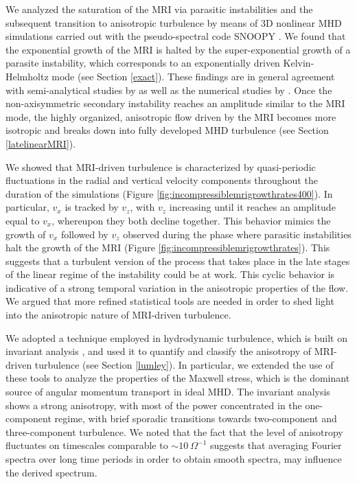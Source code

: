 \documentclass[]{emulateapj}
\begin{document}
We analyzed the saturation of the MRI via parasitic instabilities
and the subsequent transition to anisotropic turbulence by means of 3D
nonlinear MHD simulations carried out with the pseudo-spectral code
SNOOPY \citep{Lesur:2009ey}.  
We found that the exponential growth of the MRI is halted by the super-exponential
growth of a parasite instability, which corresponds to an
exponentially driven Kelvin-Helmholtz mode (see Section \ref{exact}).  
These findings are in general agreement with semi-analytical studies by
\citet{Goodman:1994dd, Pessah:2010ic} as well as the numerical studies by 
\citet{Latter:2009br,2010A&A...516A..51L,Obergaulinger:2009fv}.
Once the non-axisymmetric secondary instability reaches
an amplitude similar to the MRI mode, the highly organized,
anisotropic flow driven by the MRI becomes more isotropic and breaks
down into fully developed MHD turbulence (see Section \ref{latelinearMRI}).  

We showed that MRI-driven turbulence is
characterized by quasi-periodic fluctuations in the radial and
vertical velocity components throughout the duration of the
simulations (Figure \ref{fig:incompressiblemrigrowthrates400}).  
In particular, $v_x$ is tracked by $v_z$, with $v_z$
increasing until it reaches an amplitude equal to $v_x$, whereupon
they both decline together.  This behavior mimics the growth of $v_x$
followed by $v_z$ observed during the phase where parasitic
instabilities halt the growth of the MRI (Figure \ref{fig:incompressiblemrigrowthrates}).
This suggests that a turbulent version of the process that takes place
in the late stages of the linear regime of the instability could be at work.
This cyclic behavior is indicative of a strong temporal variation in the anisotropic
properties of the flow. We argued that more refined statistical tools
are needed in order to shed light into the anisotropic nature of MRI-driven
turbulence.  

We adopted a technique employed in hydrodynamic turbulence,
which is built on invariant analysis \citep{1977JFM....82..161L}, and 
used it to quantify and classify 
the anisotropy of MRI-driven turbulence (see Section \ref{lumley}). 
In particular, we extended the use of these tools to analyze the properties
of the Maxwell stress, which is the dominant source of angular
momentum transport in ideal MHD.  The invariant analysis shows a strong anisotropy,
with most of the power concentrated in the one-component regime, with
brief sporadic transitions towards two-component and three-component
turbulence.  We noted that the fact that the level of anisotropy fluctuates on
timescales comparable to $\sim\!\!10~\Omega^{-1}$  suggests that
averaging Fourier spectra over long time periods in order to obtain
smooth spectra, may influence the derived spectrum.
\end{document}
